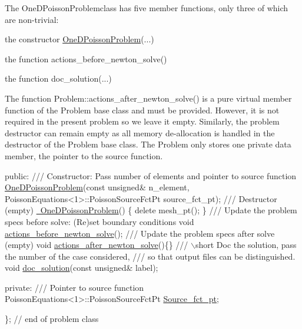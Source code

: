 The {\ttfamily One\+D\+Poisson\+Problemclass} has five member functions, only three of which are non-\/trivial\+:
\begin{DoxyItemize}
\item the constructor {\ttfamily \hyperlink{classOneDPoissonProblem}{One\+D\+Poisson\+Problem}}(...)
\item the function {\ttfamily actions\+\_\+before\+\_\+newton\+\_\+solve()} 
\item the function {\ttfamily doc\+\_\+solution}(...)
\end{DoxyItemize}The function {\ttfamily Problem\+::actions\+\_\+after\+\_\+newton\+\_\+solve()} is a pure virtual member function of the {\ttfamily Problem} base class and must be provided. However, it is not required in the present problem so we leave it empty. Similarly, the problem destructor can remain empty as all memory de-\/allocation is handled in the destructor of the {\ttfamily Problem} base class. The Problem only stores one private data member, the pointer to the source function.


\begin{DoxyCodeInclude}
\textcolor{keyword}{public}:
\textcolor{comment}{}
\textcolor{comment}{ /// Constructor: Pass number of elements and pointer to source function}
\textcolor{comment}{} \hyperlink{classOneDPoissonProblem_ab814af5dfd3b7ae665cd20e27da5d9ae}{OneDPoissonProblem}(\textcolor{keyword}{const} \textcolor{keywordtype}{unsigned}& n\_element, 
                    PoissonEquations<1>::PoissonSourceFctPt source\_fct\_pt);
\textcolor{comment}{}
\textcolor{comment}{ /// Destructor (empty)}
\textcolor{comment}{} \hyperlink{classOneDPoissonProblem_a940fa32d7939788e27b708818fb046ec}{~OneDPoissonProblem}()
  \{
   \textcolor{keyword}{delete} mesh\_pt();
  \}
\textcolor{comment}{}
\textcolor{comment}{ /// Update the problem specs before solve: (Re)set boundary conditions}
\textcolor{comment}{} \textcolor{keywordtype}{void} \hyperlink{classOneDPoissonProblem_a6e42423869771fbd216326cba516a76b}{actions\_before\_newton\_solve}();
\textcolor{comment}{}
\textcolor{comment}{ /// Update the problem specs after solve (empty)}
\textcolor{comment}{} \textcolor{keywordtype}{void} \hyperlink{classOneDPoissonProblem_ab023d367cc68b77a7828536333c924ed}{actions\_after\_newton\_solve}()\{\}
\textcolor{comment}{}
\textcolor{comment}{ /// \(\backslash\)short Doc the solution, pass the number of the case considered,}
\textcolor{comment}{ /// so that output files can be distinguished.}
\textcolor{comment}{} \textcolor{keywordtype}{void} \hyperlink{classOneDPoissonProblem_aaf42d034e42e7615acfa262a9c56b638}{doc\_solution}(\textcolor{keyword}{const} \textcolor{keywordtype}{unsigned}& label);

\textcolor{keyword}{private}:
\textcolor{comment}{}
\textcolor{comment}{ /// Pointer to source function}
\textcolor{comment}{} PoissonEquations<1>::PoissonSourceFctPt \hyperlink{classOneDPoissonProblem_a5fdff4b9218f56dec7fbc282f2428eef}{Source\_fct\_pt};

\}; \textcolor{comment}{// end of problem class}

\end{DoxyCodeInclude}



